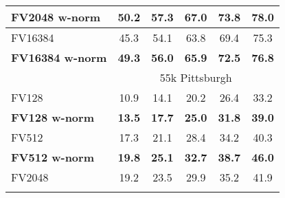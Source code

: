 \begin{tabularx}{0.864\linewidth}{|l|c c c c c|}
	    \textbf{FV2048 w-norm}  & \textbf{50.2} & \textbf{57.3} & \textbf{67.0} & \textbf{73.8} & \textbf{78.0} \\
	    \hline
	    \rowcolor{maroon!10}
		\textcolor{petr}{FV16384}						&\textcolor{petr}{45.3}     
	    												&\textcolor{petr}{54.1}     
	    												&\textcolor{petr}{63.8}     
	    												&\textcolor{petr}{69.4}    
	    												&\textcolor{petr}{75.3}   \\ 
	    \rowcolor{maroon!10}
	    \textcolor{petr}{\textbf{FV16384 w-norm}}		&\textcolor{petr}{\textbf{49.3}}      
	    												&\textcolor{petr}{\textbf{56.0}}      
	    												&\textcolor{petr}{\textbf{65.9}}      
	    												&\textcolor{petr}{\textbf{72.5}}      
	    												&\textcolor{petr}{\textbf{76.8}} 	\\
			\rowcolor{maroon!40}
			\multicolumn{1}{|c}{\quad} & \multicolumn{5}{c|}{55k Pittsburgh} \\
		\hline 
			\rowcolor{maroon!10}
			FV128     & 10.9 & 14.1 & 20.2 & 26.4 & 33.2 \\
			\rowcolor{maroon!10}
			\textbf{FV128 w-norm}  & \textbf{13.5}  &  \textbf{17.7}  &  \textbf{25.0}  &  \textbf{31.8}  &  \textbf{39.0} \\
	    \hline  
	    \rowcolor{maroon!10}
	    FV512   & 17.3 &  21.1 &  28.4 &  34.2 &  40.3 \\      
	    \rowcolor{maroon!10}
	    \rowcolor{maroon!10}
	    \textbf{FV512 w-norm}  & \textbf{19.8} &  \textbf{25.1} &  \textbf{32.7}  & \textbf{38.7} &  \textbf{46.0} \\
	    \hline
		\rowcolor{maroon!10}
		FV2048        & 19.2 & 23.5 & 29.9 &  35.2 &  41.9 \\
		\rowcolor{maroon!10}

\end{tabularx}
